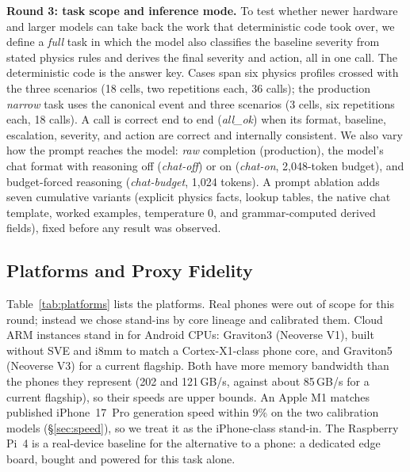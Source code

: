 \documentclass[conference]{IEEEtran}
\begin{document}
\textbf{Round 3: task scope and inference mode.} To test whether newer hardware and larger models can take back the work that deterministic code took over, we define a \emph{full} task in which the model also classifies the baseline severity from stated physics rules and derives the final severity and action, all in one call. The deterministic code is the answer key. Cases span six physics profiles crossed with the three scenarios (18 cells, two repetitions each, 36 calls); the production \emph{narrow} task uses the canonical event and three scenarios (3 cells, six repetitions each, 18 calls). A call is correct end to end (\emph{all\_ok}) when its format, baseline, escalation, severity, and action are correct and internally consistent. We also vary how the prompt reaches the model: \emph{raw} completion (production), the model's chat format with reasoning off (\emph{chat-off}) or on (\emph{chat-on}, 2,048-token budget), and budget-forced reasoning (\emph{chat-budget}, 1,024 tokens). A prompt ablation adds seven cumulative variants (explicit physics facts, lookup tables, the native chat template, worked examples, temperature 0, and grammar-computed derived fields), fixed before any result was observed.

\subsection{Platforms and Proxy Fidelity}

Table~\ref{tab:platforms} lists the platforms. Real phones were out of scope for this round; instead we chose stand-ins by core lineage and calibrated them. Cloud ARM instances stand in for Android CPUs: Graviton3 (Neoverse V1), built without SVE and i8mm to match a Cortex-X1-class phone core, and Graviton5 (Neoverse V3) for a current flagship. Both have more memory bandwidth than the phones they represent (202 and 121\,GB/s, against about 85\,GB/s for a current flagship), so their speeds are upper bounds. An Apple M1 matches published iPhone~17~Pro generation speed within 9\% on the two calibration models (\S\ref{sec:speed}), so we treat it as the iPhone-class stand-in. The Raspberry Pi~4 is a real-device baseline for the alternative to a phone: a dedicated edge board, bought and powered for this task alone.
\end{document}
